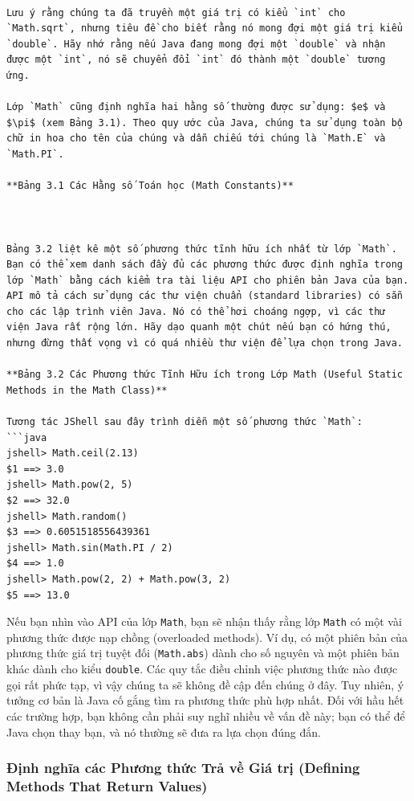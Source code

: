 \begin{verbatim}

Lưu ý rằng chúng ta đã truyền một giá trị có kiểu `int` cho `Math.sqrt`, nhưng tiêu đề cho biết rằng nó mong đợi một giá trị kiểu `double`. Hãy nhớ rằng nếu Java đang mong đợi một `double` và nhận được một `int`, nó sẽ chuyển đổi `int` đó thành một `double` tương ứng.

Lớp `Math` cũng định nghĩa hai hằng số thường được sử dụng: $e$ và $\pi$ (xem Bảng 3.1). Theo quy ước của Java, chúng ta sử dụng toàn bộ chữ in hoa cho tên của chúng và dẫn chiếu tới chúng là `Math.E` và `Math.PI`.

**Bảng 3.1 Các Hằng số Toán học (Math Constants)**



Bảng 3.2 liệt kê một số phương thức tĩnh hữu ích nhất từ lớp `Math`. Bạn có thể xem danh sách đầy đủ các phương thức được định nghĩa trong lớp `Math` bằng cách kiểm tra tài liệu API cho phiên bản Java của bạn. API mô tả cách sử dụng các thư viện chuẩn (standard libraries) có sẵn cho các lập trình viên Java. Nó có thể hơi choáng ngợp, vì các thư viện Java rất rộng lớn. Hãy dạo quanh một chút nếu bạn có hứng thú, nhưng đừng thất vọng vì có quá nhiều thư viện để lựa chọn trong Java.

**Bảng 3.2 Các Phương thức Tĩnh Hữu ích trong Lớp Math (Useful Static Methods in the Math Class)**

Tương tác JShell sau đây trình diễn một số phương thức `Math`:
```java
jshell> Math.ceil(2.13)
$1 ==> 3.0
jshell> Math.pow(2, 5)
$2 ==> 32.0
jshell> Math.random()
$3 ==> 0.6051518556439361
jshell> Math.sin(Math.PI / 2)
$4 ==> 1.0
jshell> Math.pow(2, 2) + Math.pow(3, 2)
$5 ==> 13.0
\end{verbatim}

Nếu bạn nhìn vào API của lớp \texttt{Math}, bạn sẽ nhận thấy rằng lớp
\texttt{Math} có một vài phương thức được nạp chồng (overloaded
methods). Ví dụ, có một phiên bản của phương thức giá trị tuyệt đối
(\texttt{Math.abs}) dành cho số nguyên và một phiên bản khác dành cho
kiểu \texttt{double}. Các quy tắc điều chỉnh việc phương thức nào được
gọi rất phức tạp, vì vậy chúng ta sẽ không đề cập đến chúng ở đây. Tuy
nhiên, ý tưởng cơ bản là Java cố gắng tìm ra phương thức phù hợp nhất.
Đối với hầu hết các trường hợp, bạn không cần phải suy nghĩ nhiều về vấn
đề này; bạn có thể để Java chọn thay bạn, và nó thường sẽ đưa ra lựa
chọn đúng đắn.

\subsubsection{Định nghĩa các Phương thức Trả về Giá trị (Defining
Methods That Return
Values)}\label{ux111ux1ecbnh-nghux129a-cuxe1c-phux1b0ux1a1ng-thux1ee9c-trux1ea3-vux1ec1-giuxe1-trux1ecb-defining-methods-that-return-values}

